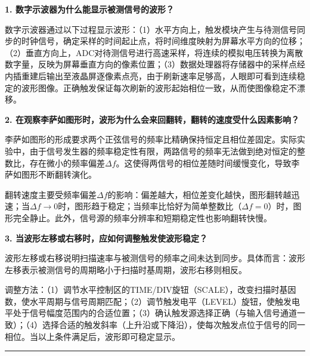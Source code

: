 \documentclass[a4paper,12pt]{article}
\begin{document}
{\fontsize{12pt}{18pt}\selectfont

\textbf{1. 数字示波器为什么能显示被测信号的波形？}

\vspace{0.2cm}

数字示波器通过以下过程显示波形：（1）水平方向上，触发模块产生与待测信号同步的时钟信号，确定采样的时间起止点，将时间维度映射为屏幕水平方向的位移；（2）垂直方向上，ADC对待测信号进行高速采样，将连续的模拟电压转换为离散数字量，反映为屏幕垂直方向的像素位置；（3）数据处理器将存储器中的采样点经内插重建后输出至液晶屏逐像素点亮，由于刷新速率足够高，人眼即可看到连续稳定的波形图像。正确触发保证每次刷新的波形起始相位一致，从而使图像稳定不漂移。

\vspace{0.5cm}

\textbf{2. 在观察李萨如图形时，波形为什么会来回翻转，翻转的速度受什么因素影响？}

\vspace{0.2cm}

李萨如图形的形成要求两个正弦信号的频率比精确保持恒定且相位差固定。实际实验中，由于信号发生器的频率稳定性有限，两路信号的频率无法做到绝对恒定的整数比，存在微小的频率偏差$\Delta f$。这使得两信号的相位差随时间缓慢变化，导致李萨如图形不断翻转演化。

翻转速度主要受频率偏差$\Delta f$的影响：偏差越大，相位差变化越快，图形翻转越迅速；当$\Delta f \to 0$时，图形趋于稳定；当频率比恰好为简单整数比（$\Delta f = 0$）时，图形完全静止。此外，信号源的频率分辨率和短期稳定性也影响翻转快慢。

\vspace{0.5cm}

\textbf{3. 当波形左移或右移时，应如何调整触发使波形稳定？}

\vspace{0.2cm}

波形左移或右移说明扫描速率与被测信号的频率之间未达到同步。具体而言：波形左移表示被测信号的周期略小于扫描时基周期，波形右移则相反。

调整方法：（1）调节水平控制区的TIME/DIV旋钮（SCALE），改变扫描时基因数，使水平周期与信号周期匹配；（2）调节触发电平（LEVEL）旋钮，使触发电平处于信号幅度范围内的合适位置；（3）确认触发源选择正确（与输入信号通道一致）；（4）选择合适的触发斜率（上升沿或下降沿），使每次触发点位于信号的同一相位。当以上条件满足后，波形即可稳定显示。

}

\vfill

\noindent\rule{\textwidth}{0.4pt}
\end{document}
